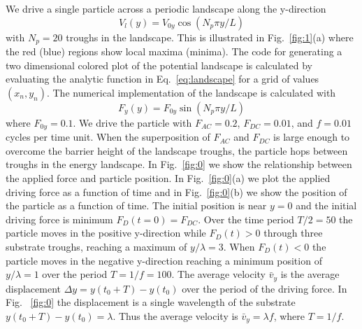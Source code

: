 \documentclass[twocolumn,preprintnumbers,amsmath,amssymb,aps,prx]{revtex4}
\begin{document}
We drive a single particle across a periodic landscape 
along the y-direction 
\begin{equation}
  \label{eq:landscape}
  V_l(y) = V_{0y} \cos{(N_p \pi y / L)} 
\end{equation}
with $N_p=20$ troughs in the landscape.
This is illustrated in Fig.~\ref{fig:1}(a) where
the red (blue) regions show local maxima (minima).
The code for generating
a two dimensional colored plot
of the potential landscape
is calculated by evaluating
the analytic function in Eq.~\ref{eq:landscape}
for a grid of values $(x_n,y_n)$.
The numerical implementation of the landscape 
is calculated with
\begin{equation}
  \label{eq:landscape}
  F_y(y) = F_{0y} \sin{(N_p \pi y / L)} 
\end{equation}
where $F_{0y} = 0.1$.
We drive the particle with
$F_{AC}=0.2$, $F_{DC}=0.01$, and $f=0.01$ cycles per time unit.
When the superposition of $F_{AC}$ and $F_{DC}$ is large enough
to overcome the barrier height of the landscape troughs,
the particle hops between troughs in the energy landscape.
In Fig.~\ref{fig:0} we
show the relationship between the applied force and particle
position.
In Fig.~\ref{fig:0}(a)
we plot the applied driving force
as a function of time
and in Fig.~\ref{fig:0}(b) 
we show the position of the particle
as a function of time.
The initial position is near $y=0$
and the initial driving force is minimum
$F_D(t=0) = F_{DC}$.
Over the time period $T/2 = 50$ %
the particle moves
in the positive y-direction
while $F_{D}(t) > 0 $
through three
substrate troughs, reaching a maximum of $y/\lambda = 3$.
When $F_{D}(t) < 0 $
the particle moves in the negative y-direction
reaching a minimum position
of $y/\lambda = 1$
over the period $T = 1/f = 100$.
The average velocity $\bar{v}_y$
is the average displacement $\Delta y = y(t_0+T) - y(t_0)$
over the period of the driving force.
In Fig. ~\ref{fig:0}
the displacement is a single wavelength
of the substrate $y(t_0+T) - y(t_0) = \lambda$.
Thus the average velocity 
is $\bar{v}_y = \lambda f$, where $T = 1/f$.
\end{document}
